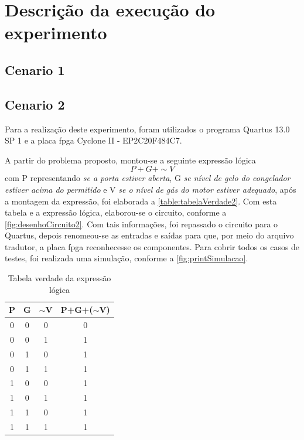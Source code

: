 
\chapter{Descrição da execução do experimento}

\section{Cenario 1}

\section{Cenario 2}
	Para a realização deste experimento, foram utilizados o programa Quartus 13.0 SP 1 e a placa \ac{fpga}
	Cyclone II - EP2C20F484C7.

	A partir do problema proposto, montou-se a seguinte expressão lógica
	$$ P + G + \sim V$$
	com P representando \textit{se a porta estiver aberta}, G
	\textit{se nível de gelo do congelador estiver acima do permitido} e V
	\textit{se o nível de gás do motor estiver adequado}, após a
	montagem da expressão, foi elaborada a \autoref{table:tabelaVerdade2}. Com esta tabela e a expressão lógica,
	elaborou-se o circuito, conforme a \autoref{fig:desenhoCircuito2}. Com tais informações, foi repassado o circuito
	para o Quartus, depois renomeou-se as entradas e saídas para que, por meio do arquivo tradutor, a placa
	\ac{fpga} reconhecesse os componentes.
	Para cobrir todos os casos de testes, foi realizada uma simulação, conforme a \autoref{fig:printSimulacao}.

	\begin{table}[h]
		\centering
		\caption{Tabela verdade da expressão lógica}\label{table:tabelaVerdade2}
		\begin{tabular}{c|c|c|c}
			\textbf{P} & \textbf{G} & \textbf{$\sim$V} & \textbf{P+G+($\sim$V)} \\
			\hline
			0 & 0 & 0 & 0\\\hline
			0 & 0 & 1 & 1\\\hline
			0 & 1 & 0 & 1\\\hline
			0 & 1 & 1 & 1\\\hline
			1 & 0 & 0 & 1\\\hline
			1 & 0 & 1 & 1\\\hline
			1 & 1 & 0 & 1\\\hline
			1 & 1 & 1 & 1
		\end{tabular}
	\end{table}

